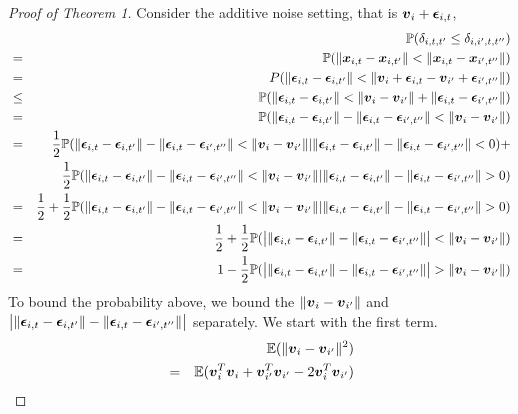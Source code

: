 \documentclass{article}
\begin{document}
\appendix
\begin{proof}[Proof of Theorem 1]
	Consider the additive noise setting, that is $\boldsymbol{v}_{i} + \boldsymbol{\epsilon}_{i,t}$,  
	\begin{eqnarray*}
		& &\PP(\delta_{i,t,t'} \leq \delta_{i,i',t,t''}) \\
		&=&\PP(\|\bx_{i,t}-\bx_{i,t'}\|<\|\bx_{i,t}-\bx_{i',t''}\|) \\
		&=&P(\|\mb{\epsilon}_{i,t}-\mb{\epsilon}_{i,t'}\| < \|\bv_{i}+\mb{\epsilon}_{i,t}-\bv_{i'}+\mb{\epsilon}_{i',t''}\|) \\
		&\leq&\PP(\|\mb{\epsilon}_{i,t}-\mb{\epsilon}_{i,t'}\| < \|\bv_{i}-\bv_{i'}\| + \|\mb{\epsilon}_{i,t}-\mb{\epsilon}_{i',t''}\|) \\
		&=& \PP(\|\mb{\epsilon}_{i,t}-\mb{\epsilon}_{i,t'}\|-\|\mb{\epsilon}_{i,t}-\mb{\epsilon}_{i',t''}\|< \|\bv_{i}-\bv_{i'}\|) \\
		&=& \frac{1}{2}\PP(\|\mb{\epsilon}_{i,t}-\mb{\epsilon}_{i,t'}\|-\|\mb{\epsilon}_{i,t}-\mb{\epsilon}_{i',t''}\|< \|\bv_{i}-\bv_{i'}\||\|\mb{\epsilon}_{i,t}-\mb{\epsilon}_{i,t'}\|-\|\mb{\epsilon}_{i,t}-\mb{\epsilon}_{i',t''}\|<0) + \\ 
		& &\frac{1}{2}\PP(\|\mb{\epsilon}_{i,t}-\mb{\epsilon}_{i,t'}\|-\|\mb{\epsilon}_{i,t}-\mb{\epsilon}_{i',t''}\|< \|\bv_{i}-\bv_{i'}\||\|\mb{\epsilon}_{i,t}-\mb{\epsilon}_{i,t'}\|-\|\mb{\epsilon}_{i,t}-\mb{\epsilon}_{i',t''}\|>0) \\
		&=&\frac{1}{2} + \frac{1}{2}\PP(\|\mb{\epsilon}_{i,t}-\mb{\epsilon}_{i,t'}\|-\|\mb{\epsilon}_{i,t}-\mb{\epsilon}_{i',t''}\|< \|\bv_{i}-\bv_{i'}\||\|\mb{\epsilon}_{i,t}-\mb{\epsilon}_{i,t'}\|-\|\mb{\epsilon}_{i,t}-\mb{\epsilon}_{i',t''}\|>0) \\
		&=& \frac{1}{2} + \frac{1}{2}\PP(\big| \|\mb{\epsilon}_{i,t}-\mb{\epsilon}_{i,t'}\|-\|\mb{\epsilon}_{i,t}-\mb{\epsilon}_{i',t''}\| \big|< \|\bv_{i}-\bv_{i'}\|)\\
		&=& 1 - \frac{1}{2} \PP(\big| \|\mb{\epsilon}_{i,t}-\mb{\epsilon}_{i,t'}\|-\|\mb{\epsilon}_{i,t}-\mb{\epsilon}_{i',t''}\| \big|> \|\bv_{i}-\bv_{i'}\|)\\
	\end{eqnarray*}
	To bound the probability above, we bound the $\|\boldsymbol{v}_{i}-\boldsymbol{v}_{i'}\|$ and $\big| \|\boldsymbol{\epsilon}_{i,t}-\boldsymbol{\epsilon}_{i,t'}\|-\|\boldsymbol{\epsilon}_{i,t}-\boldsymbol{\epsilon}_{i',t''}\| \big|$ separately. We start with the first term.
	\begin{eqnarray*}
		& &\EE(\|\bv_{i}-\bv_{i'}\|^2) \\
		&=&\EE(\bv_{i}^T \bv_{i}+\bv_{i'}^T\bv_{i'} -2\bv_{i}^T \bv_{i'}) \\

\end{eqnarray*}
\end{proof}
\end{document}
